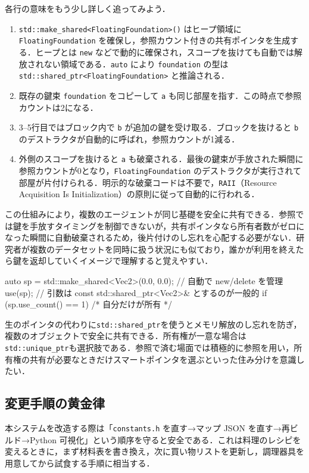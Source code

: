 \documentclass[10pt,letterpaper]{jsarticle}
\begin{document}
各行の意味をもう少し詳しく追ってみよう．
\begin{enumerate}
  \item \verb|std::make_shared<FloatingFoundation>()| はヒープ領域に\verb|FloatingFoundation| を確保し，参照カウント付きの共有ポインタを生成する．ヒープとは \verb|new| などで動的に確保され，スコープを抜けても自動では解放されない領域である．\verb|auto| により \verb|foundation| の型は \verb|std::shared_ptr<FloatingFoundation>| と推論される．
  \item 既存の鍵束 \verb|foundation| をコピーして \verb|a| も同じ部屋を指す．この時点で参照カウントは2になる．
  \item 3--5行目ではブロック内で \verb|b| が追加の鍵を受け取る．ブロックを抜けると \verb|b| のデストラクタが自動的に呼ばれ，参照カウントが1減る．
  \item 外側のスコープを抜けると \verb|a| も破棄される．最後の鍵束が手放された瞬間に参照カウントが0となり，\verb|FloatingFoundation| のデストラクタが実行されて部屋が片付けられる．明示的な破棄コードは不要で，\texttt{RAII}（Resource Acquisition Is Initialization）の原則に従って自動的に行われる．
\end{enumerate}

この仕組みにより，複数のエージェントが同じ基礎を安全に共有できる．参照では鍵を手放すタイミングを制御できないが，共有ポインタなら所有者数がゼロになった瞬間に自動破棄されるため，後片付けのし忘れを心配する必要がない．研究者が複数のデータセットを同時に扱う状況にも似ており，誰かが利用を終えたら鍵を返却していくイメージで理解すると覚えやすい．

\begin{cppcode}
auto sp = std::make_shared<Vec2>(0.0, 0.0); // 自動で new/delete を管理
use(sp); // 引数は const std::shared_ptr<Vec2>& とするのが一般的
if (sp.use_count() == 1) { /* 自分だけが所有 */ }
\end{cppcode}
生のポインタの代わりに\verb|std::shared_ptr|を使うとメモリ解放のし忘れを防ぎ，複数のオブジェクトで安全に共有できる．所有権が一意な場合は\verb|std::unique_ptr|も選択肢である．参照で済む場面では積極的に参照を用い，所有権の共有が必要なときだけスマートポインタを選ぶといった住み分けを意識したい．

\subsection{変更手順の黄金律}
本システムを改造する際は「\verb|constants.h| を直す→マップ JSON を直す→再ビルド→Python 可視化」という順序を守ると安全である．これは料理のレシピを変えるときに，まず材料表を書き換え，次に買い物リストを更新し，調理器具を用意してから試食する手順に相当する．
\end{document}
